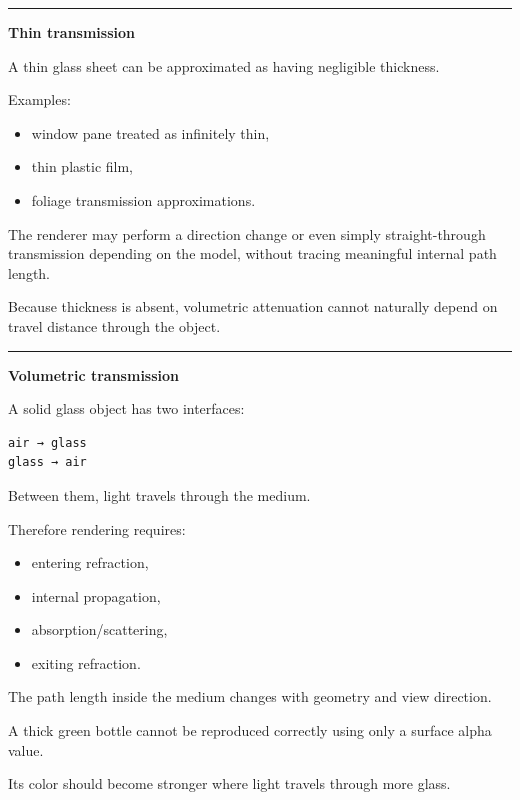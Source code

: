 \begin{center}\rule{0.5\linewidth}{0.5pt}\end{center}

\textbf{Thin transmission}

A thin glass sheet can be approximated as having negligible thickness.

Examples:

\begin{itemize}
\tightlist
\item
  window pane treated as infinitely thin,
\item
  thin plastic film,
\item
  foliage transmission approximations.
\end{itemize}

The renderer may perform a direction change or even simply straight-through transmission depending on the model, without tracing meaningful internal path length.

Because thickness is absent, volumetric attenuation cannot naturally depend on travel distance through the object.

\begin{center}\rule{0.5\linewidth}{0.5pt}\end{center}

\textbf{Volumetric transmission}

A solid glass object has two interfaces:

\begin{verbatim}
air → glass
glass → air
\end{verbatim}

Between them, light travels through the medium.

Therefore rendering requires:

\begin{itemize}
\tightlist
\item
  entering refraction,
\item
  internal propagation,
\item
  absorption/scattering,
\item
  exiting refraction.
\end{itemize}

The path length inside the medium changes with geometry and view direction.

A thick green bottle cannot be reproduced correctly using only a surface alpha value.

Its color should become stronger where light travels through more glass.

